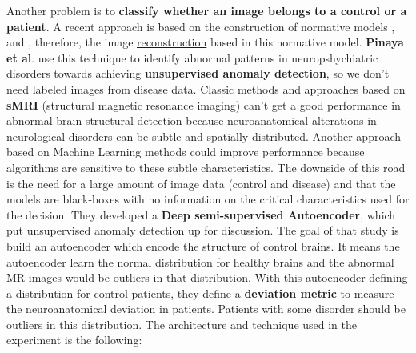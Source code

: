 Another problem is to \textbf{classify whether an image belongs to a control or a patient}. A recent approach is based on the construction of normative models \cite{marquand2016normative}, and , therefore, the image \underline{reconstruction} based in this normative model. \textbf{Pinaya et al}. \cite{pinaya2019} use this technique to identify abnormal patterns in neuropshychiatric disorders towards achieving \textbf{unsupervised anomaly detection}, so we don't need labeled images from disease data.
Classic methods and approaches based on \textbf{sMRI} (structural magnetic resonance imaging) can't get a good performance in abnormal brain structural detection because neuroanatomical alterations in neurological disorders can be subtle and spatially distributed. Another approach based on Machine Learning methods could improve performance because algorithms are sensitive to these subtle characteristics. The downside of this road is the need for a large amount of image data (control and disease) and that the models are black-boxes with no information on the critical characteristics used for the decision. They developed a \textbf{Deep semi-supervised Autoencoder}, which put unsupervised anomaly detection up for discussion.
The goal of that study is build an autoencoder which encode the structure of control brains. It means the autoencoder learn the normal distribution for healthy brains and the abnormal MR images would be outliers in that distribution. With this autoencoder defining a distribution for control patients, they define a \textbf{deviation metric} to measure the neuroanatomical deviation in patients. Patients with some disorder should be outliers in this distribution. The architecture and technique used in the experiment is the following:
